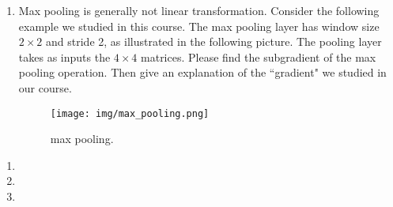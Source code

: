 \begin{exercise}
\begin{enumerate}
\begin{enumerate}
                \item Max pooling is generally not linear transformation. Consider the following example we studied in this course. The max pooling layer has window size $2\times2$ and stride 2, as illustrated in the following picture. The pooling layer takes as inputs the $4\times4 $ matrices. Please find the subgradient of the max pooling operation. Then give an explanation of the ``gradient" we studied in our course.
                    \begin{figure}[H]
                        \centering
                        \texttt{[image: img/max\_pooling.png]}
                        \caption{max pooling.}
                    \end{figure}
            \end{enumerate}

            \begin{solution}
                \begin{enumerate}
                    \item []
                    \item
                    \item
                        \qedhere
                \end{enumerate}
            \end{solution}

    \end{enumerate}

\end{exercise}



